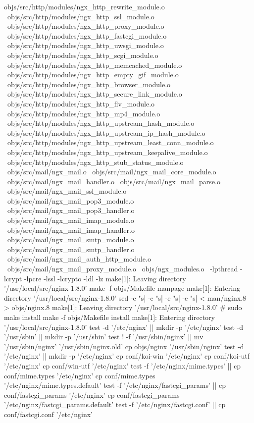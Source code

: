 objs/src/http/modules/ngx_http_rewrite_module.o \
objs/src/http/modules/ngx_http_ssl_module.o \
objs/src/http/modules/ngx_http_proxy_module.o \
objs/src/http/modules/ngx_http_fastcgi_module.o \
objs/src/http/modules/ngx_http_uwsgi_module.o \
objs/src/http/modules/ngx_http_scgi_module.o \
objs/src/http/modules/ngx_http_memcached_module.o \
objs/src/http/modules/ngx_http_empty_gif_module.o \
objs/src/http/modules/ngx_http_browser_module.o \
objs/src/http/modules/ngx_http_secure_link_module.o \
objs/src/http/modules/ngx_http_flv_module.o \
objs/src/http/modules/ngx_http_mp4_module.o \
objs/src/http/modules/ngx_http_upstream_hash_module.o \
objs/src/http/modules/ngx_http_upstream_ip_hash_module.o \
objs/src/http/modules/ngx_http_upstream_least_conn_module.o \
objs/src/http/modules/ngx_http_upstream_keepalive_module.o \
objs/src/http/modules/ngx_http_stub_status_module.o \
objs/src/mail/ngx_mail.o \
objs/src/mail/ngx_mail_core_module.o \
objs/src/mail/ngx_mail_handler.o \
objs/src/mail/ngx_mail_parse.o \
objs/src/mail/ngx_mail_ssl_module.o \
objs/src/mail/ngx_mail_pop3_module.o \
objs/src/mail/ngx_mail_pop3_handler.o \
objs/src/mail/ngx_mail_imap_module.o \
objs/src/mail/ngx_mail_imap_handler.o \
objs/src/mail/ngx_mail_smtp_module.o \
objs/src/mail/ngx_mail_smtp_handler.o \
objs/src/mail/ngx_mail_auth_http_module.o \
objs/src/mail/ngx_mail_proxy_module.o \
objs/ngx_modules.o \
-lpthread -lcrypt -lpcre -lssl -lcrypto -ldl -lz
make[1]: Leaving directory '/usr/local/src/nginx-1.8.0'
make -f objs/Makefile manpage
make[1]: Entering directory '/usr/local/src/nginx-1.8.0'
sed -e "s|%
	-e "s|%
	-e "s|%
	-e "s|%
	< man/nginx.8 > objs/nginx.8
make[1]: Leaving directory '/usr/local/src/nginx-1.8.0'
# sudo make install
make -f objs/Makefile install
make[1]: Entering directory '/usr/local/src/nginx-1.8.0'
test -d '/etc/nginx' || mkdir -p '/etc/nginx'
test -d '/usr/sbin' 		|| mkdir -p '/usr/sbin'
test ! -f '/usr/sbin/nginx' 		|| mv '/usr/sbin/nginx' 			'/usr/sbin/nginx.old'
cp objs/nginx '/usr/sbin/nginx'
test -d '/etc/nginx' 		|| mkdir -p '/etc/nginx'
cp conf/koi-win '/etc/nginx'
cp conf/koi-utf '/etc/nginx'
cp conf/win-utf '/etc/nginx'
test -f '/etc/nginx/mime.types' 		|| cp conf/mime.types '/etc/nginx'
cp conf/mime.types '/etc/nginx/mime.types.default'
test -f '/etc/nginx/fastcgi_params' 		|| cp conf/fastcgi_params '/etc/nginx'
cp conf/fastcgi_params 		'/etc/nginx/fastcgi_params.default'
test -f '/etc/nginx/fastcgi.conf' 		|| cp conf/fastcgi.conf '/etc/nginx'

